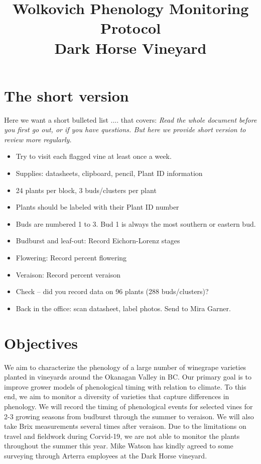 \documentclass[11pt,letter]{article}
\newenvironment{smitemize}{
\begin{itemize}
  \setlength{\itemsep}{0pt}
  \setlength{\parskip}{0.8pt}
  \setlength{\parsep}{0pt}}
{\end{itemize}
}
\begin{document}

\renewcommand{\refname}{\CHead{}}

\title{Wolkovich Phenology Monitoring Protocol\\
Dark Horse Vineyard}
\date{ }
\maketitle
\tableofcontents
\newpage
\section{The short version} %
Here we want a short bulleted list .... that covers:
\emph{Read the whole document before you first go out, or if you have questions. But here we provide short version to review more regularly.}
\begin{smitemize}
\item Try to visit each flagged vine at least once a week.
\item Supplies: datasheets, clipboard, pencil, Plant ID information
\item 24 plants per block, 3 buds/clusters per plant
\item Plants should be labeled with their Plant ID number
\item Buds are numbered 1 to 3. Bud 1 is always the most southern or eastern bud.
\item Budburst and leaf-out: Record Eichorn-Lorenz stages
\item Flowering: Record percent flowering
\item Veraison: Record percent veraison
\item Check -- did you record data on 96 plants (288 buds/clusters)?
\item Back in the office: scan datasheet, label photos. Send to Mira Garner.
\end{smitemize}
\newpage

\section{Objectives}
We aim to characterize the phenology of a large number of winegrape varieties planted in vineyards around the Okanagan Valley in BC. Our primary goal is to improve grower models of phenological timing with relation to climate. To this end, we aim to monitor a diversity of varieties that capture differences in phenology. We will record the timing of phenological events for selected vines for 2-3 growing seasons from budburst through the summer to veraison. We will also take Brix measurements several times after veraison. Due to the limitations on travel and fieldwork during Corvid-19, we are not able to monitor the plants throughout the summer this year. Mike Watson has kindly agreed to some surveying through Arterra employees at the Dark Horse vineyard.
\end{document}
